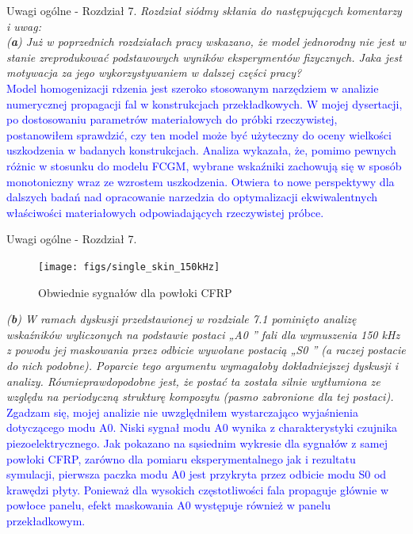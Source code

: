 \documentclass[10pt,aspectratio=169]{beamer} %
\begin{document}
\begin{frame}[label=frame29]{Uwagi ogólne - Rozdział 7.}\justifying
\textit{Rozdział siódmy skłania do następujących komentarzy i uwag:\\
(\textbf{a}) Już w poprzednich rozdziałach pracy wskazano, że model jednorodny nie jest w stanie zreprodukować podstawowych wyników eksperymentów fizycznych. Jaka jest motywacja za jego wykorzystywaniem w dalszej części pracy?}\\
\textcolor{blue}{Model homogenizacji rdzenia jest szeroko stosowanym narzędziem w analizie numerycznej propagacji fal w konstrukcjach przekładkowych. W mojej dysertacji, po dostosowaniu parametrów materiałowych do próbki rzeczywistej, postanowiłem sprawdzić, czy ten model może być użyteczny do oceny wielkości uszkodzenia w badanych konstrukcjach. Analiza wykazała, że, pomimo pewnych różnic w stosunku do modelu FCGM, wybrane wskaźniki zachowują się w sposób monotoniczny wraz ze wzrostem uszkodzenia. Otwiera to nowe perspektywy dla dalszych badań nad opracowanie narzedzia do optymalizacji ekwiwalentnych właściwości materiałowych odpowiadających rzeczywistej próbce.}
\end{frame}
\begin{frame}[label=frame30]{Uwagi ogólne - Rozdział 7.}\justifying
	\begin{figure}
	\centering
	\caption{Obwiednie sygnałów dla powłoki CFRP}
	\texttt{[image: figs/single\_skin\_150kHz]}
	\label{fig:single_skin_150kHz}
	\end{figure}	
\textit{(\textbf{b}) W ramach dyskusji przedstawionej w rozdziale 7.1 pominięto analizę wskaźników wyliczonych na podstawie postaci „A0 ” fali dla wymuszenia 150 kHz z powodu jej maskowania przez odbicie wywołane postacią „S0 ” (a raczej postacie do nich podobne). Poparcie tego argumentu wymagałoby dokładniejszej dyskusji i analizy. Równieprawdopodobne jest, że postać ta została silnie wytłumiona ze względu na periodyczną strukturę kompozytu (pasmo zabronione dla tej postaci).}
\textcolor{blue}{Zgadzam się, mojej analizie nie uwzględniłem wystarczająco wyjaśnienia dotyczącego modu A0. Niski sygnał modu A0 wynika z charakterystyki czujnika piezoelektrycznego. Jak pokazano na sąsiednim wykresie dla sygnałów z samej powłoki CFRP, zarówno dla pomiaru eksperymentalnego jak i rezultatu symulacji, pierwsza paczka modu A0 jest przykryta przez odbicie modu S0 od krawędzi płyty. Ponieważ dla wysokich częstotliwości fala propaguje głównie w powłoce panelu, efekt maskowania A0 występuje również w panelu przekładkowym.}
\end{frame}
\end{document}

